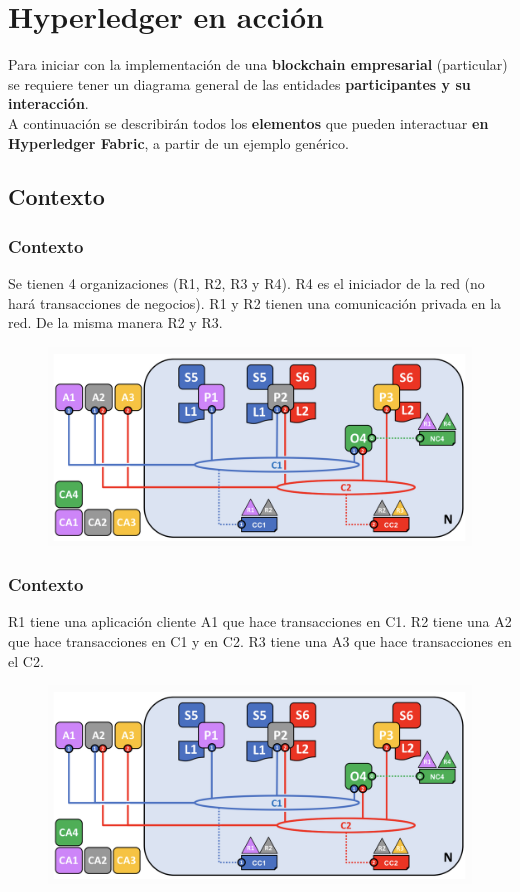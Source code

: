 \documentclass{beamer}
\begin{document}
	\section{Hyperledger en acción}
	
	\begin{frame}
		Para iniciar con la implementación de una \textbf{blockchain empresarial} (particular) se requiere tener un diagrama general de las entidades \textbf{participantes y su interacción}.\\
		\vspace{4mm}
		A continuación se describirán todos los \textbf{elementos} que pueden interactuar \textbf{en Hyperledger Fabric}, a partir de un ejemplo genérico.
	\end{frame}
	
	\subsection{Contexto}
	
	\begin{frame}
		\frametitle{Contexto}
		Se tienen 4 organizaciones (R1, R2, R3 y R4). R4 es el iniciador de la red (no hará transacciones de negocios). R1 y R2 tienen una comunicación privada en la red. De la misma manera R2 y R3.
		\begin{figure}[h]
			\includegraphics[scale=.3]{start_01}
			\centering
		\end{figure}
	\end{frame}
	
	\begin{frame}
		\frametitle{Contexto}
		R1 tiene una aplicación cliente A1 que hace transacciones en C1. R2 tiene una A2 que hace transacciones en C1 y en C2. R3 tiene una A3 que hace transacciones en el C2.
		\begin{figure}[h]
			\includegraphics[scale=.3]{start_01}
			\centering
		\end{figure}
	\end{frame}
	
\end{document}
